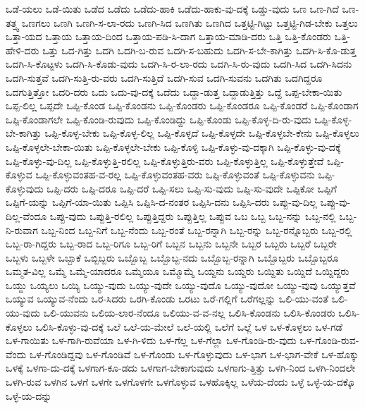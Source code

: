 {ಒಡೆ-ಯಲು
ಒಡೆ-ಯಿತು
ಒಡೆದ
ಒಡೆದು
ಒಡೆದು-ಹಾಕಿ
ಒಡೆದು-ಹಾಕು-ವು-ದಕ್ಕೆ
ಒಡ್ಡು-ವುದು
ಒಣ
ಒಣ-ಗಿದೆ
ಒಣ-ತತ್ತ್ವ
ಒಣಗಲು
ಒಣಗಿ
ಒಣಗಿ-ಸ-ಲಾ-ರದು
ಒಣಗಿ-ಸಿದ
ಒಣಗಿತು
ಒಣಗಿದ
ಒತ್ತಟ್ಟಿ-ಗಿಟ್ಟು
ಒತ್ತಟ್ಟಿ-ಗಿಡ-ಬೇಕು
ಒತ್ತಲು
ಒತ್ತಾ-ಯದ
ಒತ್ತಾಯ
ಒತ್ತಾಯ-ದಿಂದ
ಒತ್ತಾಯ-ಪಡಿ-ಸಿ-ದಾಗ
ಒತ್ತಾಯ-ಮಾಡಿ-ದರು
ಒತ್ತಿ
ಒತ್ತಿ-ಕೊಂಡರು
ಒತ್ತಿ-ಹೇಳಿ-ದರು
ಒತ್ತು
ಒದ-ಗಿತ್ತು
ಒದಗಿ
ಒದಗಿ-ಬ-ರುವ
ಒದಗಿ-ಸ-ಬಹುದು
ಒದಗಿ-ಸ-ಬೇ-ಕಾಗಿತ್ತು
ಒದಗಿ-ಸಿ-ಕೊ-ಡುತ್ತ
ಒದಗಿ-ಸಿ-ಕೊಟ್ಟಳು
ಒದಗಿ-ಸಿ-ಕೊಡು-ವುದು
ಒದಗಿ-ಸಿ-ರ-ಲಾ-ರದು
ಒದಗಿ-ಸಿ-ರು-ವುದು
ಒದಗಿ-ಸಿದ
ಒದಗಿ-ಸಿದನು
ಒದಗಿ-ಸುತ್ತವೆ
ಒದಗಿ-ಸುತ್ತಿ-ರು-ವರು
ಒದಗಿ-ಸುತ್ತಿದೆ
ಒದಗಿ-ಸುವ
ಒದಗಿ-ಸುವನು
ಒದಗಿತು
ಒದಗಿದ್ದರೂ
ಒದಗುತ್ತಿತ್ತೋ
ಒದರಿ-ದರು
ಒದು
ಒದು-ವು-ದಕ್ಕೆ
ಒದೆದು
ಒದ್ದಾ-ಡುತ್ತ
ಒದ್ದಾಡುತ್ತಿತ್ತು
ಒದ್ದೆ
ಒಪ್ಪ-ಬೇಕಾ-ಯಿತು
ಒಪ್ಪ-ಲಿಲ್ಲ
ಒಪ್ಪದೇ
ಒಪ್ಪಿ-ಕೊಂಡ
ಒಪ್ಪಿ-ಕೊಂಡನು
ಒಪ್ಪಿ-ಕೊಂಡರು
ಒಪ್ಪಿ-ಕೊಂಡರೂ
ಒಪ್ಪಿ-ಕೊಂಡರೆ
ಒಪ್ಪಿ-ಕೊಂಡಾಗ
ಒಪ್ಪಿ-ಕೊಂಡಾಗಲೇ
ಒಪ್ಪಿ-ಕೊಂಡಿ-ರುವುದು
ಒಪ್ಪಿ-ಕೊಂಡಿದ್ದು
ಒಪ್ಪಿ-ಕೊಂಡು
ಒಪ್ಪಿ-ಕೊಳ್ಳ-ದಿ-ರು-ವುದು
ಒಪ್ಪಿ-ಕೊಳ್ಳ-ಬೇ-ಕಾಗಿತ್ತು
ಒಪ್ಪಿ-ಕೊಳ್ಳ-ಬೇಕು
ಒಪ್ಪಿ-ಕೊಳ್ಳ-ಲಿಲ್ಲ
ಒಪ್ಪಿ-ಕೊಳ್ಳದೆ
ಒಪ್ಪಿ-ಕೊಳ್ಳದೇ
ಒಪ್ಪಿ-ಕೊಳ್ಳಬೇ-ಕೇನು
ಒಪ್ಪಿ-ಕೊಳ್ಳಲು
ಒಪ್ಪಿ-ಕೊಳ್ಳಲೇ-ಬೇಕಾ-ಯಿತು
ಒಪ್ಪಿ-ಕೊಳ್ಳಲೇ-ಬೇಕು
ಒಪ್ಪಿ-ಕೊಳ್ಳಿ
ಒಪ್ಪಿ-ಕೊಳ್ಳು-ವು-ದಕ್ಕಾಗಿ
ಒಪ್ಪಿ-ಕೊಳ್ಳು-ವು-ದಕ್ಕೆ
ಒಪ್ಪಿ-ಕೊಳ್ಳು-ವು-ದಿಲ್ಲ
ಒಪ್ಪಿ-ಕೊಳ್ಳುತ್ತಿ-ರಲಿಲ್ಲ
ಒಪ್ಪಿ-ಕೊಳ್ಳುತ್ತಿರು-ವರು
ಒಪ್ಪಿ-ಕೊಳ್ಳುತ್ತಿಲ್ಲ
ಒಪ್ಪಿ-ಕೊಳ್ಳುತ್ತೇವೆ
ಒಪ್ಪಿ-ಕೊಳ್ಳುವ
ಒಪ್ಪಿ-ಕೊಳ್ಳುವಂತಹ-ವ-ರಲ್ಲ
ಒಪ್ಪಿ-ಕೊಳ್ಳುವಂತಹ-ವರು
ಒಪ್ಪಿ-ಕೊಳ್ಳುವಂತೆ
ಒಪ್ಪಿ-ಕೊಳ್ಳುವನು
ಒಪ್ಪಿ-ಕೊಳ್ಳುವುದು
ಒಪ್ಪಿ-ದರು
ಒಪ್ಪಿ-ದರೂ
ಒಪ್ಪಿ-ದರೆ
ಒಪ್ಪಿ-ಸಲು
ಒಪ್ಪಿ-ಸು-ವುದು
ಒಪ್ಪಿ-ಸು-ವುದೇ
ಒಪ್ಪಿಕೋ
ಒಪ್ಪಿಗೆ
ಒಪ್ಪಿಗೆ-ಯನ್ನು
ಒಪ್ಪಿಗೆ-ಯಾ-ಯಿತು
ಒಪ್ಪಿಸಿ
ಒಪ್ಪಿಸಿ-ದ-ನಂತರ
ಒಪ್ಪಿಸಿ-ದನು
ಒಪ್ಪಿಸಿ-ದರು
ಒಪ್ಪು-ವು-ದಿಲ್ಲ
ಒಪ್ಪು-ವು-ದಿಲ್ಲ-ವೆಂದೂ
ಒಪ್ಪು-ವುದು
ಒಪ್ಪುತ್ತಿ-ರಲಿಲ್ಲ
ಒಪ್ಪುತ್ತಿದ್ದರು
ಒಪ್ಪುತ್ತಿಲ್ಲ
ಒಪ್ಪುವ
ಒಬ
ಒಬ್ಬ
ಒಬ್ಬ-ನನ್ನು
ಒಬ್ಬ-ನಲ್ಲಿ
ಒಬ್ಬ-ನಿ-ರುವಾಗ
ಒಬ್ಬ-ನಿಂದ
ಒಬ್ಬ-ನಿಗೆ
ಒಬ್ಬ-ನೆಂದು
ಒಬ್ಬ-ರಂತೆ
ಒಬ್ಬ-ರನ್ನಾಗಿ
ಒಬ್ಬ-ರನ್ನು
ಒಬ್ಬ-ರನ್ನೊಬ್ಬರು
ಒಬ್ಬ-ರಲ್ಲಿ
ಒಬ್ಬ-ರಾ-ಗಿದ್ದರು
ಒಬ್ಬ-ರಾದ
ಒಬ್ಬ-ರಿಗೂ
ಒಬ್ಬ-ರಿಗೆ
ಒಬ್ಬನ
ಒಬ್ಬನು
ಒಬ್ಬನೇ
ಒಬ್ಬರ
ಒಬ್ಬರು
ಒಬ್ಬರೆ
ಒಬ್ಬರೇ
ಒಬ್ಬಳು
ಒಬ್ಬಳೇ
ಒಬ್ಬಾಕೆ
ಒಬ್ಬಿಬ್ಬರು
ಒಬ್ಬೊಬ್ಬ
ಒಬ್ಬೊಬ್ಬ-ನದು
ಒಬ್ಬೊಬ್ಬ-ರನ್ನಾಗಿ
ಒಬ್ಬೊಬ್ಬರು
ಒಬ್ಬೊಬ್ಬರೂ
ಒಮ್ಮತ-ವಿಲ್ಲ
ಒಮ್ಮೆ
ಒಮ್ಮೆ-ಯಾದರೂ
ಒಮ್ಮೆಯೂ
ಒಮ್ಮೊಮ್ಮೆ
ಒಯ್ದನು
ಒಯ್ದರು
ಒಯ್ದಿತು
ಒಯ್ದಿದೆ
ಒಯ್ದಿದ್ದರು
ಒಯ್ದು
ಒಯ್ಯಲು
ಒಯ್ಯಿ
ಒಯ್ಯು-ವುದು
ಒಯ್ಯು-ವುದೇ
ಒಯ್ಯು-ವುದೊ
ಒಯ್ಯು-ವುದೋ
ಒಯ್ಯು-ವುವು
ಒಯ್ಯುತ್ತವೆ
ಒಯ್ಯುವ
ಒಯ್ಯುವ-ನೆಂದು
ಒರ-ಸಿದರು
ಒರಗಿ-ಕೊಂಡು
ಒರಟು
ಒರೆ-ಗಲ್ಲಿಗೆ
ಒರೆಗಲ್ಲನ್ನು
ಒಲಿ-ಯು-ವಂತೆ
ಒಲಿ-ಯು-ವುದು
ಒಲಿ-ಯುವನು
ಒಲಿಯ-ಲಾರ-ನೆಂದೂ
ಒಲಿಯು-ವ-ವ-ನಲ್ಲ
ಒಲಿಸಿ-ಕೊಂಡನು
ಒಲಿಸಿ-ಕೊಂಡರು
ಒಲಿಸಿ-ಕೊಳ್ಳಲು
ಒಲಿಸಿ-ಕೊಳ್ಳು-ವು-ದಕ್ಕೆ
ಒಲೆ
ಒಲೆ-ಯ-ಮೇಲೆ
ಒಲೆ-ಯಲ್ಲಿ
ಒಲೆಗೆ
ಒಲ್ಲೆ
ಒಳ
ಒಳ-ಕೊಳ್ಳಲು
ಒಳ-ಗಡೆ
ಒಳ-ಗಾಯಿತು
ಒಳ-ಗಾಗಿ-ರುವೆಯಾ
ಒಳ-ಗಿ-ಳಿದು
ಒಳ-ಗೆಲ್ಲ
ಒಳ-ಗೆಲ್ಲಾ
ಒಳ-ಗೊಂಡಿ-ರು-ವುದು
ಒಳ-ಗೊಂಡಿ-ರುವ-ವೆಂದು
ಒಳ-ಗೊಂಡಿದ್ದವು
ಒಳ-ಗೊಂಡಿವೆ
ಒಳ-ಗೊಂಡು
ಒಳ-ಗೊಳ್ಳುವುದು
ಒಳ-ಭಾಗ
ಒಳ-ಭಾಗ-ವೇಕೆ
ಒಳ-ಹೊಕ್ಕು
ಒಳಕ್ಕೆ
ಒಳಗಾ-ದು-ದಕ್ಕೆ
ಒಳಗಾಗ-ಕೂ-ಡದು
ಒಳಗಾಗ-ಬೇಕಾಗುವುದು
ಒಳಗಾಗು-ತ್ತಿತ್ತು
ಒಳಗಿ-ನಿಂದ
ಒಳಗಿ-ನಿಂದಲೇ
ಒಳಗಿ-ರುವ
ಒಳಗಿನ
ಒಳಗೆ
ಒಳಗೇ
ಒಳಗೊಳಗೇ
ಒಳಗೊಳ್ಳುವ
ಒಳಹೊಕ್ಕಿಲ್ಲ
ಒಳೆಯ-ದೆಂದು
ಒಳ್ಳೆ
ಒಳ್ಳೆ-ಯ-ದಕ್ಕೊ
ಒಳ್ಳೆ-ಯ-ದನ್ನು
}
